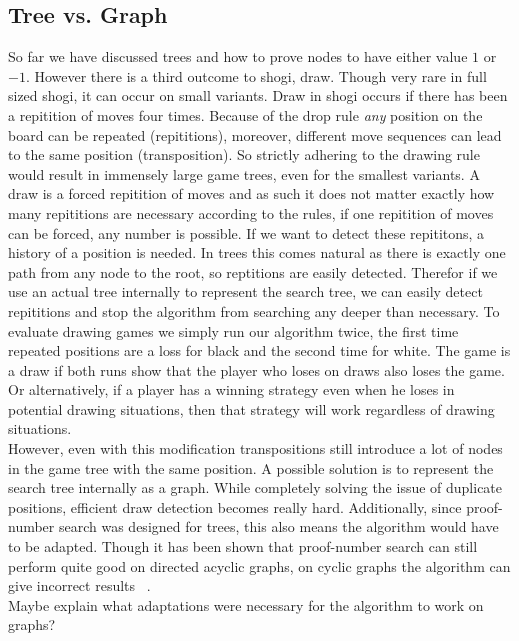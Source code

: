 \documentclass{article}
\begin{document}
\subsection{Tree vs. Graph}
So far we have discussed trees and how to prove nodes to have either value $1$ or $-1$. However there is a third outcome to shogi, draw. Though
very rare in full sized shogi, it can occur on small variants. Draw in shogi occurs if there has been a repitition
of moves four times. Because of the drop rule \textit{any} position on the board can be repeated (repititions), moreover, different move
sequences can lead to the same position (transposition). So strictly adhering to the drawing rule would result in immensely large game trees,
even for the smallest variants.
A draw is a forced repitition of moves and as such it does not matter exactly how many repititions are necessary according to the rules,
if one repitition of moves can be forced, any number is possible. If we want to detect these repititons, a history of a position is needed. In trees this
comes natural as there is exactly one path from any node to the root, so reptitions are easily detected. Therefor if we use an actual tree internally
to represent the search tree, we can easily detect repititions and stop the algorithm from searching any deeper than necessary.
To evaluate drawing games we simply run our algorithm twice, the first time repeated positions are a loss for black and the second time for white.
The game is a draw if both runs show that the player who loses on draws also loses the game. Or alternatively, if a player has a winning strategy
even when he loses in potential drawing situations, then that strategy will work regardless of drawing situations.\\

However, even with this modification transpositions still introduce a lot of nodes in the game tree with the same position. A possible solution
is to represent the search tree internally as a graph. While completely solving the issue of duplicate positions, efficient draw detection becomes
really hard. Additionally, since proof-number search was designed for trees, this also means the algorithm would have to be adapted.
Though it has been shown that proof-number search can still perform quite good on directed acyclic graphs, on cyclic graphs the algorithm
can give incorrect results ~\cite{TODO}.\\

Maybe explain what adaptations were necessary for the algorithm to work on graphs?
\end{document}
